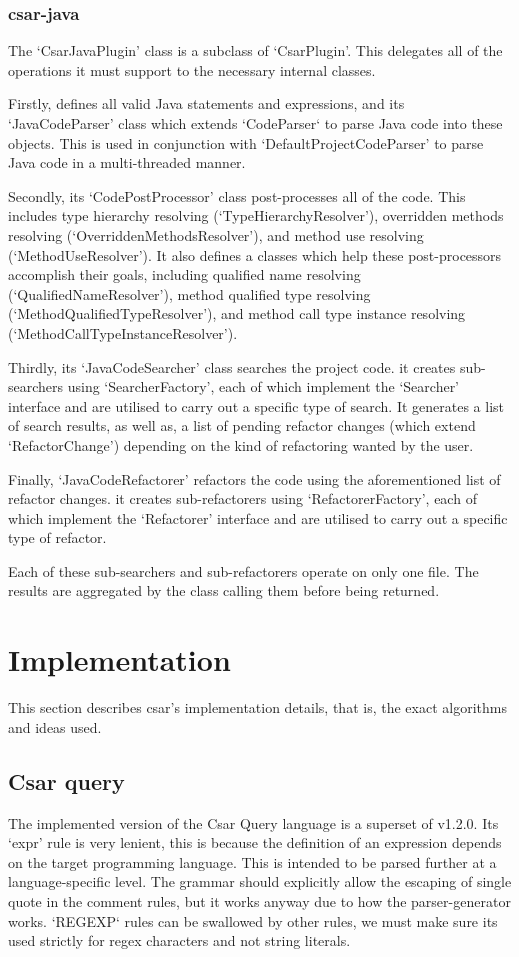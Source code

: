 \documentclass[12pt, letterpaper]{article}
\begin{document}
\subsubsection{csar-java}
The `CsarJavaPlugin' class is a subclass of `CsarPlugin'.
This delegates all of the operations it must support to the necessary internal classes.

Firstly, defines all valid Java statements and expressions, and its `JavaCodeParser' class which extends `CodeParser` to parse Java code into these objects.
This is used in conjunction with `DefaultProjectCodeParser' to parse Java code in a multi-threaded manner.

Secondly, its `CodePostProcessor' class post-processes all of the code.
This includes type hierarchy resolving (`TypeHierarchyResolver'), overridden methods resolving (`OverriddenMethodsResolver'), and method use resolving (`MethodUseResolver').
It also defines a classes which help these post-processors accomplish their goals, including qualified name resolving (`QualifiedNameResolver'), method qualified type resolving (`MethodQualifiedTypeResolver'), and method call type instance resolving (`MethodCallTypeInstanceResolver').

Thirdly, its `JavaCodeSearcher' class searches the project code.
it creates sub-searchers using `SearcherFactory', each of which implement the `Searcher' interface and are utilised to carry out a specific type of search.
It generates a list of search results, as well as, a list of pending refactor changes (which extend `RefactorChange') depending on the kind of refactoring wanted by the user.

Finally, `JavaCodeRefactorer' refactors the code using the aforementioned list of refactor changes.
it creates sub-refactorers using `RefactorerFactory', each of which implement the `Refactorer' interface and are utilised to carry out a specific type of refactor.

Each of these sub-searchers and sub-refactorers operate on only one file.
The results are aggregated by the class calling them before being returned.

\section{Implementation}
This section describes csar's implementation details, that is, the exact algorithms and ideas used.

\subsection{Csar query}
\label{sec:CsarQueryImplementation}
The implemented version of the Csar Query language is a superset of v1.2.0.
Its `expr' rule is very lenient, this is because the definition of an expression depends on the target programming language. 
This is intended to be parsed further at a language-specific level.
The grammar should explicitly allow the escaping of single quote in the comment rules, but it works anyway due to how the parser-generator works.
`REGEXP` rules can be swallowed by other rules, we must make sure its used strictly for regex characters and not string literals.
\end{document}
